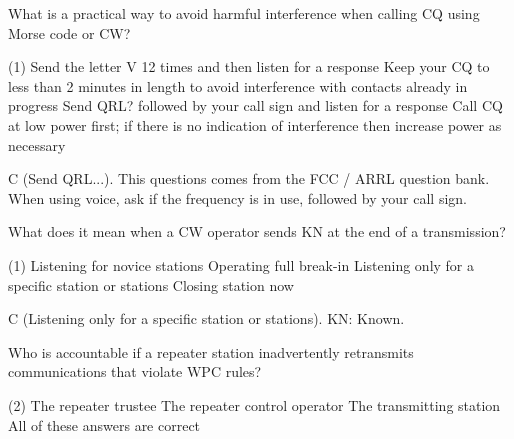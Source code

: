 \documentclass[a4paper]{article}
\begin{document}
\vspace{5mm}



\begin{question}What is a practical way to avoid harmful interference when calling CQ using Morse code or CW?
	\begin{tasks}(1)
		\task Send the letter \apostrophe{}V\apostrophe{} 12 times and then listen for a response
		\task Keep your CQ to less than 2 minutes in length to avoid interference with contacts already in progress
		\task Send \apostrophe{}QRL?\apostrophe{} followed by your call sign and listen for a response
		\task Call CQ at low power first; if there is no indication of interference then increase power as necessary
	\end{tasks}
\end{question}

\begin{solution}
	C (Send QRL...). This questions comes from the FCC / ARRL question bank. When using voice, ask if the frequency is in use, followed by your call sign.
\end{solution}

\vspace{5mm}






\begin{question}What does it mean when a CW operator sends \apostrophe{}KN\apostrophe{} at the end of a transmission?
	\begin{tasks}(1)
		\task Listening for novice stations
		\task Operating full break-in
		\task Listening only for a specific station or stations
		\task Closing station now
	\end{tasks}
\end{question}

\begin{solution}
	C (Listening only for a specific station or stations). KN: Known.
\end{solution}

\vspace{5mm}



\begin{question}Who is accountable if a repeater station inadvertently retransmits communications that violate WPC rules?
	\begin{tasks}(2)
		\task The repeater trustee
		\task The repeater control operator
		\task The transmitting station
		\task All of these answers are correct
	\end{tasks}
\end{question}
\end{document}
